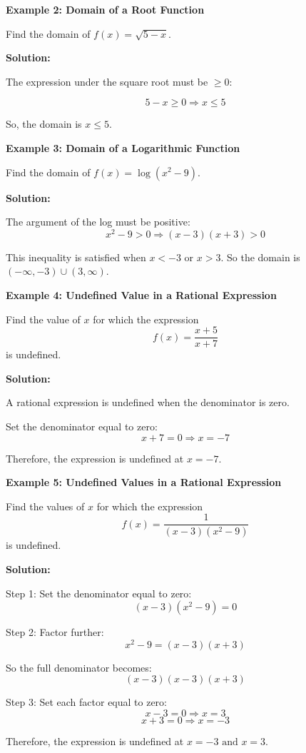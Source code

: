 \begin{flushleft}
\textbf{Example 2: Domain of a Root Function}

Find the domain of \( f(x) = \sqrt{5 - x} \).

\textbf{Solution:} \vspace{0.2cm}

The expression under the square root must be \(\geq 0\):

\[
5 - x \geq 0 \Rightarrow x \leq 5
\]

So, the domain is \( x \leq 5 \).
\end{flushleft}

\begin{flushleft}
\textbf{Example 3: Domain of a Logarithmic Function}

Find the domain of \( f(x) = \log(x^2 - 9) \).

\textbf{Solution:} \vspace{0.2cm}

The argument of the log must be positive:
\[
x^2 - 9 > 0 \Rightarrow (x - 3)(x + 3) > 0
\]

This inequality is satisfied when \( x < -3 \) or \( x > 3 \).  
So the domain is \( (-\infty, -3) \cup (3, \infty) \).
\end{flushleft}
\begin{flushleft}
\textbf{Example 4: Undefined Value in a Rational Expression}

Find the value of \(x\) for which the expression  
\[
f(x) = \frac{x + 5}{x + 7}
\]  
is undefined.

\textbf{Solution:} \vspace{0.2cm}

A rational expression is undefined when the denominator is zero.

Set the denominator equal to zero:  
\[
x + 7 = 0 \Rightarrow x = -7
\]

Therefore, the expression is undefined at \( \boxed{x = -7} \).
\end{flushleft}

\begin{flushleft}
\textbf{Example 5: Undefined Values in a Rational Expression}

Find the values of \(x\) for which the expression  
\[
f(x) = \frac{1}{(x - 3)(x^2 - 9)}
\]  
is undefined.

\textbf{Solution:} \vspace{0.2cm}

Step 1: Set the denominator equal to zero:
\[
(x - 3)(x^2 - 9) = 0
\]

Step 2: Factor further:
\[
x^2 - 9 = (x - 3)(x + 3)
\]

So the full denominator becomes:
\[
(x - 3)(x - 3)(x + 3)
\]

Step 3: Set each factor equal to zero:
\[
x - 3 = 0 \Rightarrow x = 3
\]
\[
x + 3 = 0 \Rightarrow x = -3
\]

Therefore, the expression is undefined at \( \boxed{x = -3 \text{ and } x = 3} \).
\end{flushleft}


